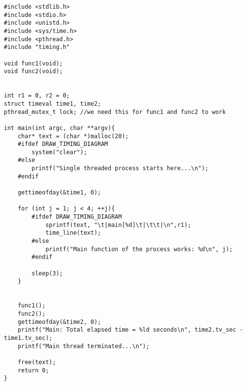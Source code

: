 \documentclass[11pt]{article}
\begin{document}
\begin{minipage}{1\textwidth}
\begin{lstlisting}[title=singlethread.c, frame=tlrb, basicstyle=\tiny]
#include <stdlib.h>
#include <stdio.h>
#include <unistd.h>
#include <sys/time.h>
#include <pthread.h>
#include "timing.h"

void func1(void);
void func2(void);


int r1 = 0, r2 = 0;
struct timeval time1, time2;
pthread_mutex_t lock; //we need this for func1 and func2 to work

int main(int argc, char **argv){
	char* text = (char *)malloc(20);
	#ifdef DRAW_TIMING_DIAGRAM
		system("clear");
	#else
		printf("Single threaded process starts here...\n");
	#endif

	gettimeofday(&time1, 0);
	
	for (int j = 1; j < 4; ++j){
		#ifdef DRAW_TIMING_DIAGRAM
			sprintf(text, "\t|main[%d]\t|\t\t|\n",r1);
			time_line(text);
		#else
			printf("Main function of the process works: %d\n", j);
		#endif
		
		sleep(3);
	}
	

	func1();
	func2();
	gettimeofday(&time2, 0);
	printf("Main: Total elapsed time = %ld seconds\n", time2.tv_sec - time1.tv_sec);
	printf("Main thread terminated...\n");

	free(text);
	return 0;
}
\end{lstlisting}
\end{minipage}
\newpage
\thispagestyle{empty}
\end{document}

